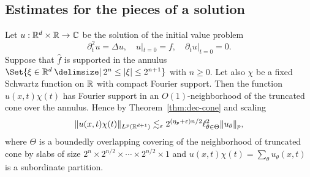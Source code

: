 \subsection{Estimates for the pieces of a solution}
Let $u : \mathbb{R}^{d} \times \mathbb{R} \to \mathbb{C}$ be the solution of the initial value problem
\begin{equation}
\label{eq:wave-initial-problem}
\partial_{t}^{2} u = \Delta u,
\quad
u|_{t=0} = f,
\quad
\partial_{t} u|_{t=0} = 0.
\end{equation}
Suppose that $\widehat{f}$ is supported in the annulus $\Set{ \xi \in \R^{d} \given 2^{n} \leq \abs{\xi} \leq 2^{n+1}}$ with $n \geq 0$.
Let also $\chi$ be a fixed Schwartz function on $\mathbb{R}$ with compact Fourier support.
Then the function $u(x,t) \chi(t)$ has Fourier support in an $O(1)$-neighborhood of the truncated cone over the annulus.
Hence by Theorem~\ref{thm:dec-cone} and scaling
\begin{equation}
\label{eq:wave-dec-est}
\lVert u(x,t) \chi(t)\rVert_{L^{p}(\mathbb{R}^{d+1})}
\lesssim_{\varepsilon}
2^{(\eta_{p}+\varepsilon)n/2} \ell^{2}_{\theta\in\Theta} \lVert u_{\theta}\rVert_{p},
\end{equation}
where $\Theta$ is a boundedly overlapping covering of the neighborhood of truncated cone by slabs of size $2^{n} \times 2^{n/2} \times \dotsm \times 2^{n/2} \times 1$ and $u(x,t)\chi(t) = \sum_{\theta} u_{\theta}(x,t)$ is a subordinate partition.


